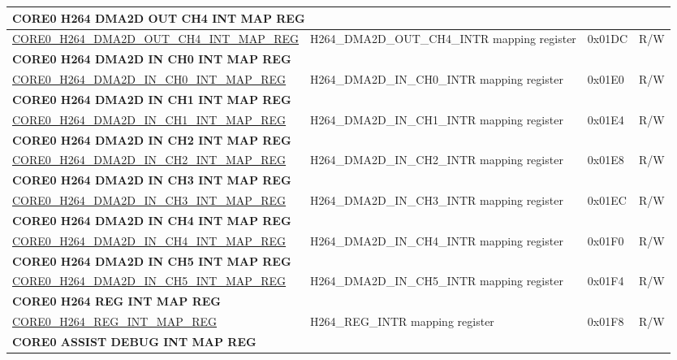 \begin{longtable}{ | p{7.5cm} | p{7.2cm} | p{1.3cm} | p{1cm} | }
\multicolumn{4}{|l|}{\textbf{CORE0 H264 DMA2D OUT CH4 INT MAP REG}} \\ \hline
\hyperref[regdesc:CORE0H264DMA2DOUTCH4INTMAPREG]{CORE0\_H264\_DMA2D\_OUT\_CH4\_INT\_MAP\_REG} & H264\_DMA2D\_OUT\_CH4\_INTR mapping register & 0x01DC & R/W \\ \hline
\multicolumn{4}{|l|}{\textbf{CORE0 H264 DMA2D IN CH0 INT MAP REG}} \\ \hline
\hyperref[regdesc:CORE0H264DMA2DINCH0INTMAPREG]{CORE0\_H264\_DMA2D\_IN\_CH0\_INT\_MAP\_REG} & H264\_DMA2D\_IN\_CH0\_INTR mapping register & 0x01E0 & R/W \\ \hline
\multicolumn{4}{|l|}{\textbf{CORE0 H264 DMA2D IN CH1 INT MAP REG}} \\ \hline
\hyperref[regdesc:CORE0H264DMA2DINCH1INTMAPREG]{CORE0\_H264\_DMA2D\_IN\_CH1\_INT\_MAP\_REG} & H264\_DMA2D\_IN\_CH1\_INTR mapping register & 0x01E4 & R/W \\ \hline
\multicolumn{4}{|l|}{\textbf{CORE0 H264 DMA2D IN CH2 INT MAP REG}} \\ \hline
\hyperref[regdesc:CORE0H264DMA2DINCH2INTMAPREG]{CORE0\_H264\_DMA2D\_IN\_CH2\_INT\_MAP\_REG} & H264\_DMA2D\_IN\_CH2\_INTR mapping register & 0x01E8 & R/W \\ \hline
\multicolumn{4}{|l|}{\textbf{CORE0 H264 DMA2D IN CH3 INT MAP REG}} \\ \hline
\hyperref[regdesc:CORE0H264DMA2DINCH3INTMAPREG]{CORE0\_H264\_DMA2D\_IN\_CH3\_INT\_MAP\_REG} & H264\_DMA2D\_IN\_CH3\_INTR mapping register & 0x01EC & R/W \\ \hline
\multicolumn{4}{|l|}{\textbf{CORE0 H264 DMA2D IN CH4 INT MAP REG}} \\ \hline
\hyperref[regdesc:CORE0H264DMA2DINCH4INTMAPREG]{CORE0\_H264\_DMA2D\_IN\_CH4\_INT\_MAP\_REG} & H264\_DMA2D\_IN\_CH4\_INTR mapping register & 0x01F0 & R/W \\ \hline
\multicolumn{4}{|l|}{\textbf{CORE0 H264 DMA2D IN CH5 INT MAP REG}} \\ \hline
\hyperref[regdesc:CORE0H264DMA2DINCH5INTMAPREG]{CORE0\_H264\_DMA2D\_IN\_CH5\_INT\_MAP\_REG} & H264\_DMA2D\_IN\_CH5\_INTR mapping register & 0x01F4 & R/W \\ \hline
\multicolumn{4}{|l|}{\textbf{CORE0 H264 REG INT MAP REG}} \\ \hline
\hyperref[regdesc:CORE0H264REGINTMAPREG]{CORE0\_H264\_REG\_INT\_MAP\_REG} & H264\_REG\_INTR mapping register & 0x01F8 & R/W \\ \hline
\multicolumn{4}{|l|}{\textbf{CORE0 ASSIST DEBUG INT MAP REG}} \\ \hline

\end{longtable}
